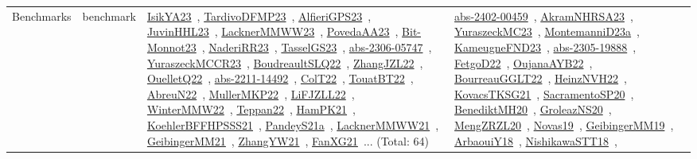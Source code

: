 {\begin{longtable}{lp{3cm}>{\raggedright\arraybackslash}p{6cm}>{\raggedright\arraybackslash}p{6cm}>{\raggedright\arraybackslash}p{8cm}}
Benchmarks & benchmark & \href{articles/IsikYA23.pdf}{IsikYA23}~\cite{IsikYA23}, \href{papers/TardivoDFMP23.pdf}{TardivoDFMP23}~\cite{TardivoDFMP23}, \href{articles/AlfieriGPS23.pdf}{AlfieriGPS23}~\cite{AlfieriGPS23}, \href{papers/JuvinHHL23.pdf}{JuvinHHL23}~\cite{JuvinHHL23}, \href{articles/LacknerMMWW23.pdf}{LacknerMMWW23}~\cite{LacknerMMWW23}, \href{papers/PovedaAA23.pdf}{PovedaAA23}~\cite{PovedaAA23}, \href{papers/Bit-Monnot23.pdf}{Bit-Monnot23}~\cite{Bit-Monnot23}, \href{articles/NaderiRR23.pdf}{NaderiRR23}~\cite{NaderiRR23}, \href{papers/TasselGS23.pdf}{TasselGS23}~\cite{TasselGS23}, \href{articles/abs-2306-05747.pdf}{abs-2306-05747}~\cite{abs-2306-05747}, \href{articles/YuraszeckMCCR23.pdf}{YuraszeckMCCR23}~\cite{YuraszeckMCCR23}, \href{papers/BoudreaultSLQ22.pdf}{BoudreaultSLQ22}~\cite{BoudreaultSLQ22}, \href{papers/ZhangJZL22.pdf}{ZhangJZL22}~\cite{ZhangJZL22}, \href{papers/OuelletQ22.pdf}{OuelletQ22}~\cite{OuelletQ22}, \href{articles/abs-2211-14492.pdf}{abs-2211-14492}~\cite{abs-2211-14492}, \href{articles/ColT22.pdf}{ColT22}~\cite{ColT22}, \href{papers/TouatBT22.pdf}{TouatBT22}~\cite{TouatBT22}, \href{articles/AbreuN22.pdf}{AbreuN22}~\cite{AbreuN22}, \href{articles/MullerMKP22.pdf}{MullerMKP22}~\cite{MullerMKP22}, \href{papers/LiFJZLL22.pdf}{LiFJZLL22}~\cite{LiFJZLL22}, \href{papers/WinterMMW22.pdf}{WinterMMW22}~\cite{WinterMMW22}, \href{papers/Teppan22.pdf}{Teppan22}~\cite{Teppan22}, \href{articles/HamPK21.pdf}{HamPK21}~\cite{HamPK21}, \href{articles/KoehlerBFFHPSSS21.pdf}{KoehlerBFFHPSSS21}~\cite{KoehlerBFFHPSSS21}, \href{articles/PandeyS21a.pdf}{PandeyS21a}~\cite{PandeyS21a}, \href{papers/LacknerMMWW21.pdf}{LacknerMMWW21}~\cite{LacknerMMWW21}, \href{papers/GeibingerMM21.pdf}{GeibingerMM21}~\cite{GeibingerMM21}, \href{articles/ZhangYW21.pdf}{ZhangYW21}~\cite{ZhangYW21}, \href{articles/FanXG21.pdf}{FanXG21}~\cite{FanXG21}... (Total: 64) & \href{articles/abs-2402-00459.pdf}{abs-2402-00459}~\cite{abs-2402-00459}, \href{articles/AkramNHRSA23.pdf}{AkramNHRSA23}~\cite{AkramNHRSA23}, \href{papers/YuraszeckMC23.pdf}{YuraszeckMC23}~\cite{YuraszeckMC23}, \href{articles/MontemanniD23a.pdf}{MontemanniD23a}~\cite{MontemanniD23a}, \href{papers/KameugneFND23.pdf}{KameugneFND23}~\cite{KameugneFND23}, \href{articles/abs-2305-19888.pdf}{abs-2305-19888}~\cite{abs-2305-19888}, \href{articles/FetgoD22.pdf}{FetgoD22}~\cite{FetgoD22}, \href{papers/OujanaAYB22.pdf}{OujanaAYB22}~\cite{OujanaAYB22}, \href{articles/BourreauGGLT22.pdf}{BourreauGGLT22}~\cite{BourreauGGLT22}, \href{articles/HeinzNVH22.pdf}{HeinzNVH22}~\cite{HeinzNVH22}, \href{papers/KovacsTKSG21.pdf}{KovacsTKSG21}~\cite{KovacsTKSG21}, \href{articles/SacramentoSP20.pdf}{SacramentoSP20}~\cite{SacramentoSP20}, \href{articles/BenediktMH20.pdf}{BenediktMH20}~\cite{BenediktMH20}, \href{papers/GroleazNS20.pdf}{GroleazNS20}~\cite{GroleazNS20}, \href{articles/MengZRZL20.pdf}{MengZRZL20}~\cite{MengZRZL20}, \href{articles/Novas19.pdf}{Novas19}~\cite{Novas19}, \href{papers/GeibingerMM19.pdf}{GeibingerMM19}~\cite{GeibingerMM19}, \href{papers/ArbaouiY18.pdf}{ArbaouiY18}~\cite{ArbaouiY18}, \href{papers/NishikawaSTT18.pdf}{NishikawaSTT18}~\cite{NishikawaSTT18}, 
\end{longtable}}
